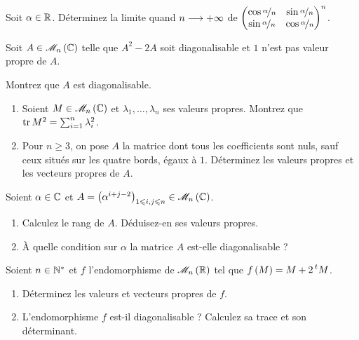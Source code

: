 \begin{exo}
Soit \(\alpha\in\mathbb{R}\). Déterminez la limite quand \(n\longrightarrow+\infty\) de \(\begin{pmatrix}
\cos\nicefrac{\alpha}{n} & \sin\nicefrac{\alpha}{n} \\
\sin\nicefrac{\alpha}{n} & \cos\nicefrac{\alpha}{n}
\end{pmatrix}^n\).
\end{exo}



\begin{exo}
Soit \(A\in\M{n}[\C]\) telle que \(A^2-2A\) soit diagonalisable et \(1\) n'est pas valeur propre de \(A\).

Montrez que \(A\) est diagonalisable.
\end{exo}



\begin{exo}
\begin{enumerate}
    \item Soient \(M\in\M{n}[\C]\) et \(\lambda_1,\dots,\lambda_n\) ses valeurs propres. Montrez que \(\operatorname{tr} M^2=\sum_{i=1}^n\lambda_i^2\). \\
    \item Pour \(n\geq3\), on pose \(A\) la matrice dont tous les coefficients sont nuls, sauf ceux situés sur les quatre bords, égaux à \(1\). Déterminez les valeurs propres et les vecteurs propres de \(A\).
\end{enumerate}
\end{exo}



\begin{exo}
Soient \(\alpha\in\mathbb{C}\) et \(A=\paren{\alpha^{i+j-2}}_{1\leq i,j\leq n}\in\M{n}[\C]\).

\begin{enumerate}
    \item Calculez le rang de \(A\). Déduisez-en ses valeurs propres. \\
    \item À quelle condition sur \(\alpha\) la matrice \(A\) est-elle diagonalisable ?
\end{enumerate}
\end{exo}



\begin{exo}
Soient \(n\in\mathbb{N}^*\) et \(f\) l'endomorphisme de \(\M{n}[\R]\) tel que \(f\left(M\right)=M+2\prescript{t}{}{M}\).

\begin{enumerate}
    \item Déterminez les valeurs et vecteurs propres de \(f\). \\
    \item L'endomorphisme \(f\) est-il diagonalisable ? Calculez sa trace et son déterminant.
\end{enumerate}
\end{exo}



